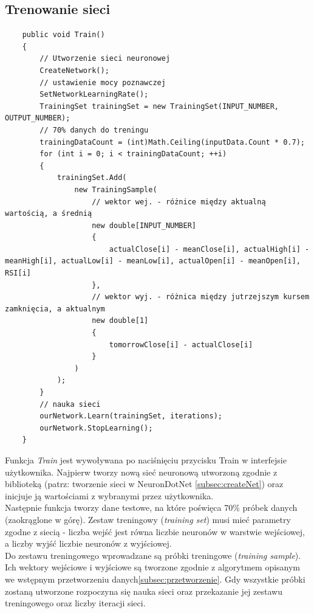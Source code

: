 \documentclass[a4paper]{article}
\begin{document}
	\subsection{Trenowanie sieci}\label{subsec:train}
	\begin{lstlisting}
	public void Train()
	{
		// Utworzenie sieci neuronowej
		CreateNetwork();
		// ustawienie mocy poznawczej
		SetNetworkLearningRate();
		TrainingSet trainingSet = new TrainingSet(INPUT_NUMBER, OUTPUT_NUMBER);
		// 70% danych do treningu
		trainingDataCount = (int)Math.Ceiling(inputData.Count * 0.7);
		for (int i = 0; i < trainingDataCount; ++i)
		{
			trainingSet.Add(
				new TrainingSample(
					// wektor wej. - różnice między aktualną wartością, a średnią
					new double[INPUT_NUMBER]
					{
						actualClose[i] - meanClose[i], actualHigh[i] - meanHigh[i], actualLow[i] - meanLow[i], actualOpen[i] - meanOpen[i], RSI[i]
					},
					// wektor wyj. - różnica między jutrzejszym kursem zamknięcia, a aktualnym
					new double[1]
					{
						tomorrowClose[i] - actualClose[i]
					}
				)
			);
		}
		// nauka sieci
		ourNetwork.Learn(trainingSet, iterations);
		ourNetwork.StopLearning();
	}
	\end{lstlisting}
	Funkcja \textit{Train} jest wywoływana po naciśnięciu przycisku Train w interfejsie użytkownika.  Najpierw tworzy nową sieć neuronową utworzoną zgodnie z biblioteką (patrz: tworzenie sieci w NeuronDotNet \ref{subsec:createNet}) oraz inicjuje ją wartościami z wybranymi przez użytkownika.\\
	Następnie funkcja tworzy dane testowe, na które poświęca 70\% próbek danych (zaokrąglone w górę). Zestaw treningowy (\emph{training set}) musi mieć parametry zgodne z siecią - liczba wejść jest równa liczbie neuronów w warstwie wejściowej, a liczby wyjść liczbie neuronów z wyjściowej.\\
	Do zestawu treningowego wprowadzane są próbki treningowe (\emph{training sample}). Ich wektory wejściowe i wyjściowe są tworzone zgodnie z algorytmem opisanym we wstępnym przetworzeniu danych\ref{subsec:przetworzenie}. Gdy wszystkie próbki zostaną utworzone rozpoczyna się nauka sieci oraz przekazanie jej zestawu treningowego oraz liczby iteracji sieci.
\end{document}

